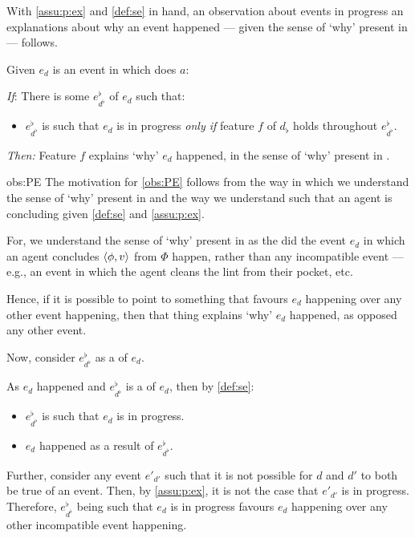 \begin{note}
  With \autoref{assu:p:ex} and \autoref{def:se} in hand, an observation about events in progress an explanations about why an event happened --- given the sense of `why' present in \qWhy{} --- follows.

  \begin{observation}[\progEx{2}]%
    \label{obs:PE}%
    Given \(e_{d}\) is an event in which \vAgent{} does \(a\):

    \begin{itenum}
    \item[\emph{If}:]
      There is some \se{} \(e^{\flat}_{d^{\flat}}\) of \(e_{d}\) such that:
      \begin{itemize}
      \item
        \(e^{\flat}_{d^{\flat}}\) is such that \(e_{d}\) is in progress \emph{only if} feature \(f\) of \(d_{\flat}\) holds throughout \(e^{\flat}_{d^{\flat}}\).
      \end{itemize}
    \item[\emph{Then:}]
      Feature \(f\) explains `why' \(e_{d}\) happened, in the sense of `why' present in \qWhy{}.
    \end{itenum}
    \vspace{-\baselineskip}
  \end{observation}

  \begin{motivation}{obs:PE}
    The motivation for \autoref{obs:PE} follows from the way in which we understand the sense of `why' present in \qWhy{} and the way we understand \se{} such that an agent is concluding given \autoref{def:se} and \autoref{assu:p:ex}.

    For, we understand the sense of `why' present in \qWhy{} as the did the event \(e_{d}\) in which an agent concludes \(\langle \phi, v \rangle\) from \(\Phi\) happen, rather than any incompatible event --- e.g., an event in which the agent cleans the lint from their pocket, etc.

    Hence, if it is possible to point to something that favours \(e_{d}\) happening over any other event happening, then that thing explains `why' \(e_{d}\) happened, as opposed any other event.
    \medskip

    \noindent%
    Now, consider \(e^{\flat}_{d^{\flat}}\) as a \se{} of \(e_{d}\).

    As \(e_{d}\) happened and \(e^{\flat}_{d^{\flat}}\) is a \se{} of \(e_{d}\), then by \autoref{def:se}:
    \begin{itemize}
    \item
      \(e^{\flat}_{d^{\flat}}\) is such that \(e_{d}\) is in progress.
    \item
      \(e_{d}\) happened as a result of \(e^{\flat}_{d^{\flat}}\).
    \end{itemize}
    Further, consider any event \(e'_{d'}\) such that it is not possible for \(d\) and \(d'\) to both be true of an event.
    Then, by \autoref{assu:p:ex}, it is not the case that \(e'_{d'}\) is in progress.
    Therefore, \(e^{\flat}_{d^{\flat}}\) being such that \(e_{d}\) is in progress favours \(e_{d}\) happening over any other incompatible event happening.


\end{motivation}
\end{note}
